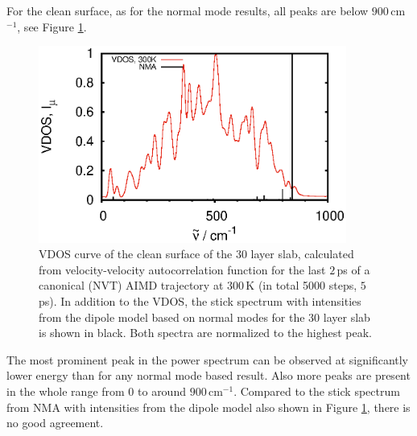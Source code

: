 \documentclass[11pt,DIV=13,BCOR=5mm,a4paper,headinclude]{scrbook}
\begin{document}
For the clean surface, as for the normal mode results, all peaks are below $900\,$cm$^{-1}$, see Figure \ref{abb:velvelclean}.
\begin{figure}[!h]
    \centering
    \includegraphics[width=0.9\textwidth]{figures/11-20/comp_cleansurf_all.eps}%
             \caption{VDOS curve of the clean surface of the 30 layer slab, calculated from velocity-velocity autocorrelation function for the last $2\,$ps of a canonical (NVT) AIMD trajectory at $300\,$K (in total 5000 steps, $5\,$ps).
In addition to the VDOS, the stick spectrum with intensities from the dipole model based on normal modes for the 30 layer slab is shown in black.
Both spectra are normalized to the highest peak.}
\label{abb:velvelclean}
\end{figure}
The most prominent peak in the power spectrum can be observed at significantly lower energy than for any normal mode based result.
Also more peaks are present in the whole range from $0$ to around $900\,$cm$^{-1}$.
Compared to the stick spectrum from NMA with intensities from the dipole model also shown in Figure \ref{abb:velvelclean}, there is no good agreement.
\\\\
\end{document}
